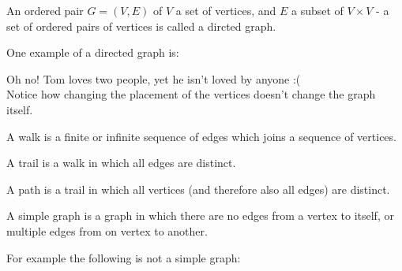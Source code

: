 \documentclass[11pt,a4paper]{article}
\begin{document}
\begin{definition}
An ordered pair $G=(V,E)$ of $V$ a set of vertices, and $E$ a subset
of $V \times V$ - a set of ordered pairs of vertices is
called a dircted graph.
\end{definition}

One example of a directed graph is:
\begin{center}
\end{center}

Oh no! Tom loves two people, yet he isn't loved by anyone :( \\
Notice how changing the placement of the vertices doesn't change the 
graph itself.

\newpage

\begin{definition}[Walk]
A walk is a finite or infinite sequence of edges which 
joins a sequence of vertices.
\end{definition}

\begin{definition}[Trail]
A trail is a walk in which all edges are distinct.
\end{definition}

\begin{definition}[Path]
A path is a trail in which all vertices 
(and therefore also all edges) are distinct.
\end{definition}

\begin{definition}
A simple graph is a graph in which there are no edges from
a vertex to itself, or multiple edges from on vertex to another.
\end{definition}

For example the following is not a simple graph:

\begin{center}
\end{center}
\end{document}

